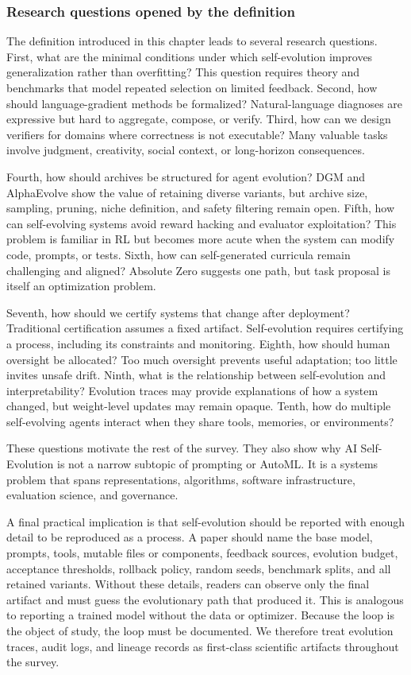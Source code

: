 \subsubsection{Research questions opened by the definition}

The definition introduced in this chapter leads to several research questions. First, what are the minimal conditions under which self-evolution improves generalization rather than overfitting? This question requires theory and benchmarks that model repeated selection on limited feedback. Second, how should language-gradient methods be formalized? Natural-language diagnoses are expressive but hard to aggregate, compose, or verify. Third, how can we design verifiers for domains where correctness is not executable? Many valuable tasks involve judgment, creativity, social context, or long-horizon consequences.

Fourth, how should archives be structured for agent evolution? DGM and AlphaEvolve show the value of retaining diverse variants, but archive size, sampling, pruning, niche definition, and safety filtering remain open. Fifth, how can self-evolving systems avoid reward hacking and evaluator exploitation? This problem is familiar in RL but becomes more acute when the system can modify code, prompts, or tests. Sixth, how can self-generated curricula remain challenging and aligned? Absolute Zero suggests one path, but task proposal is itself an optimization problem.

Seventh, how should we certify systems that change after deployment? Traditional certification assumes a fixed artifact. Self-evolution requires certifying a process, including its constraints and monitoring. Eighth, how should human oversight be allocated? Too much oversight prevents useful adaptation; too little invites unsafe drift. Ninth, what is the relationship between self-evolution and interpretability? Evolution traces may provide explanations of how a system changed, but weight-level updates may remain opaque. Tenth, how do multiple self-evolving agents interact when they share tools, memories, or environments?

These questions motivate the rest of the survey. They also show why AI Self-Evolution is not a narrow subtopic of prompting or AutoML. It is a systems problem that spans representations, algorithms, software infrastructure, evaluation science, and governance.


A final practical implication is that self-evolution should be reported with enough detail to be reproduced as a process. A paper should name the base model, prompts, tools, mutable files or components, feedback sources, evolution budget, acceptance thresholds, rollback policy, random seeds, benchmark splits, and all retained variants. Without these details, readers can observe only the final artifact and must guess the evolutionary path that produced it. This is analogous to reporting a trained model without the data or optimizer. Because the loop is the object of study, the loop must be documented. We therefore treat evolution traces, audit logs, and lineage records as first-class scientific artifacts throughout the survey.

